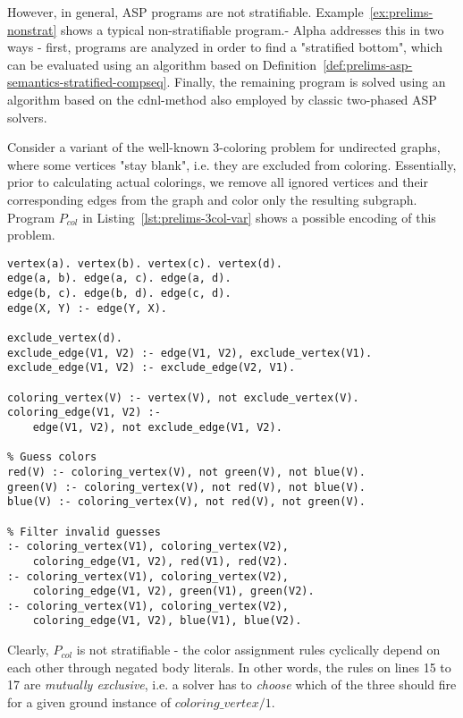 However, in general, ASP programs are not stratifiable. Example~\ref{ex:prelims-nonstrat} shows a typical non-stratifiable program.- Alpha addresses this in two ways - first, programs are analyzed in order to find a "stratified bottom", which can be evaluated using an algorithm based on Definition~\ref{def:prelims-asp-semantics-stratified-compseq}. Finally, the remaining program is solved using an algorithm based on the \gls{cdnl}-method also employed by classic two-phased ASP solvers.

\begin{example}
\label{ex:prelims-nonstrat}
Consider a variant of the well-known 3-coloring problem for undirected graphs, where some vertices "stay blank", i.e. they are excluded from coloring. Essentially, prior to calculating actual colorings, we remove all ignored vertices and their corresponding edges from the graph and color only the resulting subgraph. Program $P_{col}$ in Listing~\ref{lst:prelims-3col-var} shows a possible encoding of this problem.
\begin{lstlisting}[style=asp-code, label={lst:prelims-3col-var}, caption={Graph 3-coloring with excluded vertices}]
vertex(a). vertex(b). vertex(c). vertex(d).
edge(a, b). edge(a, c). edge(a, d).
edge(b, c). edge(b, d). edge(c, d).
edge(X, Y) :- edge(Y, X).

exclude_vertex(d).
exclude_edge(V1, V2) :- edge(V1, V2), exclude_vertex(V1).
exclude_edge(V1, V2) :- exclude_edge(V2, V1).

coloring_vertex(V) :- vertex(V), not exclude_vertex(V).
coloring_edge(V1, V2) :- 
	edge(V1, V2), not exclude_edge(V1, V2).

% Guess colors
red(V) :- coloring_vertex(V), not green(V), not blue(V).
green(V) :- coloring_vertex(V), not red(V), not blue(V).
blue(V) :- coloring_vertex(V), not red(V), not green(V).

% Filter invalid guesses
:- coloring_vertex(V1), coloring_vertex(V2), 
	coloring_edge(V1, V2), red(V1), red(V2).
:- coloring_vertex(V1), coloring_vertex(V2), 
	coloring_edge(V1, V2), green(V1), green(V2).
:- coloring_vertex(V1), coloring_vertex(V2), 
	coloring_edge(V1, V2), blue(V1), blue(V2).
\end{lstlisting}
Clearly, $P_{col}$ is not stratifiable - the color assignment rules cyclically depend on each other through negated body literals. In other words, the rules on lines 15 to 17 are \emph{mutually exclusive}, i.e. a solver has to \emph{choose} which of the three should fire for a given ground instance of $coloring\_vertex/1$.
\end{example}

